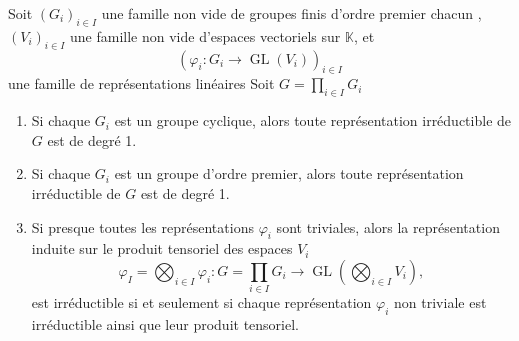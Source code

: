\documentclass[9pt]{beamer}
\begin{document}
\begin{frame}
	\begin{theorem} 
	Soit \( (G_i)_{i \in I} \) une famille non vide de groupes finis d'ordre premier chacun , \((V_i)_{i \in I} \) une famille  non vide d'espaces vectoriels sur  \(\mathbb{K}\), et  
	\[ (
	\varphi_i : G_i \to \operatorname{GL}(V_i) )_{i \in I}
	\]
	une famille de représentations linéaires
	Soit \( G =  \prod_{i \in I} G_i \)
	\begin{enumerate} [label=\roman*)]
		\item Si chaque \(G_i\) est un groupe cyclique, alors toute représentation irréductible de \( G\) est de degré 1.
		\item Si chaque \(G_i\) est un groupe d'ordre premier, alors toute représentation irréductible de \( G\) est de degré 1.
		\item Si presque toutes les représentations \( \varphi_i \) sont triviales, alors la représentation induite sur le produit tensoriel des espaces \( V_i \)
		\[
		\varphi_I = \bigotimes_{i \in I} \varphi_i : G = \prod_{i \in I} G_i \longrightarrow \operatorname{GL} \left( \bigotimes_{i \in I} V_i \right),
		\]
		est irréductible si et seulement si chaque représentation \( \varphi_i \) non triviale est irréductible ainsi que leur produit tensoriel.
	\end{enumerate} 	
\end{theorem}
\end{frame}
\end{document}
